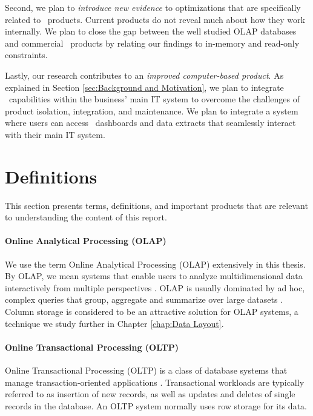 Second, we plan to \textit{introduce new evidence} to optimizations that are specifically related to \bd~products. Current products do not reveal much about how they work internally. We plan to close the gap between the well studied OLAP databases and commercial \bd~products by relating our findings to in-memory and read-only constraints.

Lastly, our research contributes to an \textit{improved computer-based product}. As explained in Section \ref{sec:Background and Motivation}, we plan to integrate \bd~capabilities within the business' main IT system to overcome the challenges of product isolation, integration, and maintenance. We plan to integrate a system where users can access \bd~dashboards and data extracts that seamlessly interact with their main IT system.

\section{Definitions}
\label{sec:Definitions}

This section presents terms, definitions, and important products that are relevant to understanding the content of this report.

\paragraph{Online Analytical Processing (OLAP)}
\label{par:Online Analytical Processing (OLAP)}
  We use the term Online Analytical Processing (OLAP) extensively in this thesis. By OLAP, we mean systems that enable users to analyze multidimensional data interactively from multiple perspectives \cite{Wikipedia_contributors2015-hw}. OLAP is usually dominated by ad hoc, complex queries that group, aggregate and summarize over large datasets \cite{Bjorklund2011-wh}. Column storage is considered to be an attractive solution for OLAP systems, a technique we study further in Chapter \ref{chap:Data Layout}.


\paragraph{Online Transactional Processing (OLTP)}
\label{par:Online Transactional Processing (OLTP)}
Online Transactional Processing (OLTP) is a class of database systems that manage transaction-oriented applications \cite{Wikipedia_contributors2015-cw}. Transactional workloads are typically referred to as insertion of new records, as well as updates and deletes of single records in the database. An OLTP system normally uses row storage for its data.

